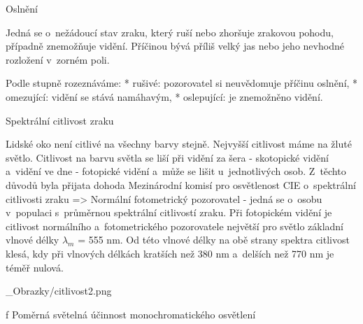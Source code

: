 \medskip\noindent
{\sbf Oslnění}

Jedná se o~nežádoucí stav zraku, který ruší nebo zhoršuje zrakovou pohodu, případně znemožňuje vidění.
Příčinou bývá příliš velký jas nebo jeho nevhodné rozložení v~zorném poli.

\medskip\noindent
Podle stupně rozeznáváme:
\begitems
* {\sbf rušivé:} pozorovatel si neuvědomuje příčinu oslnění,
* {\sbf omezující:} vidění se stává namáhavým,
* {\sbf oslepující:} je znemožněno vidění.
\enditems

\medskip\noindent
{\sbf Spektrální citlivost zraku}

Lidské oko není citlivé na všechny barvy stejně. Nejvyšší citlivost máme na žluté světlo. Citlivost na barvu
světla se liší při vidění za šera - skotopické vidění a~vidění ve dne - fotopické vidění a~může se lišit
u~jednotlivých osob.
Z~těchto důvodů byla přijata dohoda Mezinárodní komisí pro osvětlenost CIE o~spektrální
citlivosti zraku => {\sbf Normální fotometrický pozorovatel} - jedná se o~osobu v~populaci s~průměrnou
spektrální citlivostí zraku. Při fotopickém vidění je citlivost normálního a~fotometrického pozorovatele
největší pro světlo základní vlnové délky $λ_m$ = 555 nm. Od této vlnové délky na obě strany spektra
citlivost klesá, kdy při vlnových délkách kratších než 380 nm a~delších než 770 nm je téměř nulová.

\medskip

\medskip {}
\picw=10cm _Obrazky/citlivost2.png
\caption/f Poměrná světelná účinnost monochromatického osvětlení


